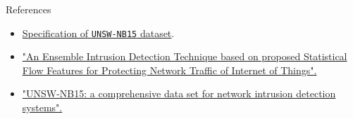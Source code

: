 \documentclass[12pt,aspectratio=169,notheorems]{beamer}
\begin{document}
\begin{frame}{References}
    \begin{itemize}
        \small
        \item \href{https://unsw-my.sharepoint.com/personal/z5025758_ad_unsw_edu_au/_layouts/15/onedrive.aspx?id=\%2Fpersonal\%2Fz5025758\%5Fad\%5Funsw\%5Fedu\%5Fau\%2FDocuments\%2FUNSW\%2DNB15\%20dataset&ga=1}{Specification of \texttt{UNSW-NB15} dataset}.
        \item \href{https://ieeexplore.ieee.org/abstract/document/8470090}{"An Ensemble Intrusion Detection Technique based on proposed Statistical Flow Features for Protecting Network Traffic of Internet of Things".}
        \item \href{https://ieeexplore.ieee.org/abstract/document/7348942}{"UNSW-NB15: a comprehensive data set for network intrusion detection systems".}
    \end{itemize}   
\end{frame}
\end{document}
